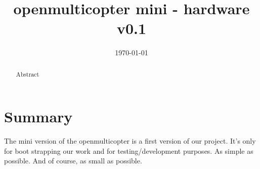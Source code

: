 \documentclass[11pt, a4paper]{article}
\title{openmulticopter mini - hardware v0.1}
\author{}
\date{\today}
\begin{document}
\maketitle

\begin{abstract}
Abstract
\end{abstract}

\newpage

\tableofcontents

\section{Summary} %
\label{sec:Summary}
The mini version of the openmulticopter is a first version of our project. It’s only for boot strapping our work and for testing/development purposes. As simple as possible. And of course, as small as possible.
\end{document}
